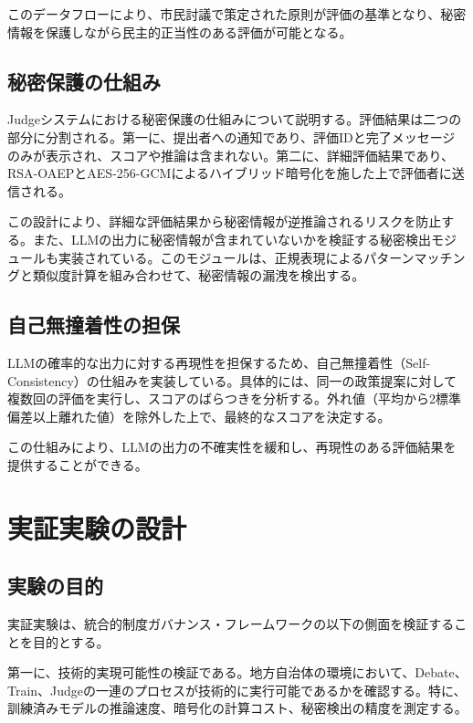 このデータフローにより、市民討議で策定された原則が評価の基準となり、秘密情報を保護しながら民主的正当性のある評価が可能となる。

\subsection{秘密保護の仕組み}

Judgeシステムにおける秘密保護の仕組みについて説明する。評価結果は二つの部分に分割される。第一に、提出者への通知であり、評価IDと完了メッセージのみが表示され、スコアや推論は含まれない。第二に、詳細評価結果であり、RSA-OAEPとAES-256-GCMによるハイブリッド暗号化を施した上で評価者に送信される。

この設計により、詳細な評価結果から秘密情報が逆推論されるリスクを防止する。また、LLMの出力に秘密情報が含まれていないかを検証する秘密検出モジュールも実装されている。このモジュールは、正規表現によるパターンマッチングと類似度計算を組み合わせて、秘密情報の漏洩を検出する。

\subsection{自己無撞着性の担保}

LLMの確率的な出力に対する再現性を担保するため、自己無撞着性（Self-Consistency）の仕組みを実装している。具体的には、同一の政策提案に対して複数回の評価を実行し、スコアのばらつきを分析する。外れ値（平均から2標準偏差以上離れた値）を除外した上で、最終的なスコアを決定する。

この仕組みにより、LLMの出力の不確実性を緩和し、再現性のある評価結果を提供することができる。

\section{実証実験の設計}
\label{sec:ch_integrated_experiment_design}

\subsection{実験の目的}

実証実験は、統合的制度ガバナンス・フレームワークの以下の側面を検証することを目的とする。

第一に、技術的実現可能性の検証である。地方自治体の環境において、Debate、Train、Judgeの一連のプロセスが技術的に実行可能であるかを確認する。特に、訓練済みモデルの推論速度、暗号化の計算コスト、秘密検出の精度を測定する。

